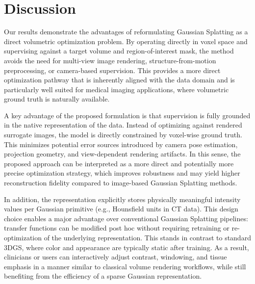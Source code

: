 \documentclass[runningheads]{llncs}
\begin{document}






\section{Discussion}

Our results demonstrate the advantages of reformulating Gaussian Splatting as a direct volumetric optimization problem. By operating directly in voxel space and supervising against a target volume and region-of-interest mask, the method avoids the need for multi-view image rendering, structure-from-motion preprocessing, or camera-based supervision. This provides a more direct optimization pathway that is inherently aligned with the data domain and is particularly well suited for medical imaging applications, where volumetric ground truth is naturally available.

A key advantage of the proposed formulation is that supervision is fully grounded in the native representation of the data. Instead of optimizing against rendered surrogate images, the model is directly constrained by voxel-wise ground truth. This minimizes potential error sources introduced by camera pose estimation, projection geometry, and view-dependent rendering artifacts. In this sense, the proposed approach can be interpreted as a more direct and potentially more precise optimization strategy, which improves robustness and may yield higher reconstruction fidelity compared to image-based Gaussian Splatting methods.

In addition, the representation explicitly stores physically meaningful intensity values per Gaussian primitive (e.g., Hounsfield units in CT data). This design choice enables a major advantage over conventional Gaussian Splatting pipelines: transfer functions can be modified post hoc without requiring retraining or re-optimization of the underlying representation. This stands in contrast to standard 3DGS, where color and appearance are typically static after training. As a result, clinicians or users can interactively adjust contrast, windowing, and tissue emphasis in a manner similar to classical volume rendering workflows, while still benefiting from the efficiency of a sparse Gaussian representation.
\end{document}
